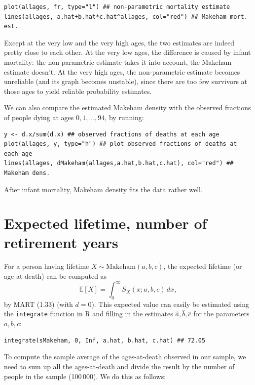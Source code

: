 \documentclass{article}
\begin{document}
\begin{enumerate}
\begin{verbatim}
plot(allages, fr, type="l") ## non-parametric mortality estimate
lines(allages, a.hat+b.hat*c.hat^allages, col="red") ## Makeham mort. est.
\end{verbatim}

Except at the very low and the very high ages, the two estimates are indeed pretty close to each other. At the very low ages, the difference is caused by infant mortality: the non-parametric estimate takes it into account, the Makeham estimate doesn't. At the very high ages, the non-parametric estimate becomes unreliable (and its graph becomes unstable), since there are too few survivors at those ages to yield reliable probability estimates.

We can also compare the estimated Makeham density with the observed fractions of people dying at ages $0, 1, \ldots, 94$, by running:

\begin{verbatim}
y <- d.x/sum(d.x) ## observed fractions of deaths at each age
plot(allages, y, type="h") ## plot observed fractions of deaths at each age
lines(allages, dMakeham(allages,a.hat,b.hat,c.hat), col="red") ## Makeham dens.
\end{verbatim}

After infant mortality, Makeham density fits the data rather well.

\section{Expected lifetime, number of retirement years}

For a person having lifetime $X \sim \text{Makeham}(a, b, c)$, the expected lifetime (or age-at-death) can be computed as
\[
\mathbb{E}[X] = \int_0^\infty S_X(x; a, b, c)\, dx,
\]
by MART (1.33) (with $d = 0$). This expected value can easily be estimated using the \texttt{integrate} function in R and filling in the estimates $\hat{a}, \hat{b}, \hat{c}$ for the parameters $a, b, c$:

\begin{verbatim}
integrate(sMakeham, 0, Inf, a.hat, b.hat, c.hat) ## 72.05
\end{verbatim}

To compute the sample average of the ages-at-death observed in our sample, we need to sum up all the ages-at-death and divide the result by the number of people in the sample (100\,000). We do this as follows:


\end{enumerate}
\end{document}
